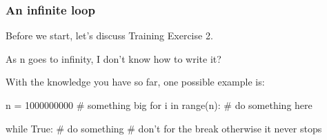 \begin{frame}[fragile]\frametitle{An infinite loop}

Before we start, let's discuss Training Exercise 2.

 As n goes to infinity, I don't know how to write it?

\pause 

With the knowledge you have so far, one possible example is:

\begin{python}
n = 1000000000 # something big 
for i in range(n):
  # do something here 
\end{python}

\pause 

\begin{python}
while True:
  # do something
  # don't for the break otherwise it never stops
\end{python}

\end{frame}
